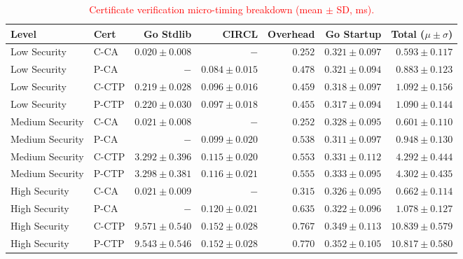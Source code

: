 \begin{table}[htbp]
  \centering
  \caption{\textcolor{red}{Certificate verification micro-timing breakdown (mean $\pm$ SD, ms).}}
  \label{tab:verify-latency}
  \begin{tabular}{llrrrrr}
    \toprule
    \textbf{Level} & \textbf{Cert} & \textbf{Go Stdlib} & \textbf{CIRCL} & \textbf{Overhead} & \textbf{Go Startup} & \textbf{Total ($\mu \pm \sigma$)} \\
    \midrule
  Low Security & C-CA & $0.020 \pm 0.008$ & $-$ & $0.252$ & $0.321 \pm 0.097$ & \textbf{$0.593 \pm 0.117$} \\
  Low Security & P-CA & $-$ & $0.084 \pm 0.015$ & $0.478$ & $0.321 \pm 0.094$ & \textbf{$0.883 \pm 0.123$} \\
  Low Security & C-CTP & $0.219 \pm 0.028$ & $0.096 \pm 0.016$ & $0.459$ & $0.318 \pm 0.097$ & \textbf{$1.092 \pm 0.156$} \\
  Low Security & P-CTP & $0.220 \pm 0.030$ & $0.097 \pm 0.018$ & $0.455$ & $0.317 \pm 0.094$ & \textbf{$1.090 \pm 0.144$} \\
  Medium Security & C-CA & $0.021 \pm 0.008$ & $-$ & $0.252$ & $0.328 \pm 0.095$ & \textbf{$0.601 \pm 0.110$} \\
  Medium Security & P-CA & $-$ & $0.099 \pm 0.020$ & $0.538$ & $0.311 \pm 0.097$ & \textbf{$0.948 \pm 0.130$} \\
  Medium Security & C-CTP & $3.292 \pm 0.396$ & $0.115 \pm 0.020$ & $0.553$ & $0.331 \pm 0.112$ & \textbf{$4.292 \pm 0.444$} \\
  Medium Security & P-CTP & $3.298 \pm 0.381$ & $0.116 \pm 0.021$ & $0.555$ & $0.333 \pm 0.095$ & \textbf{$4.302 \pm 0.435$} \\
  High Security & C-CA & $0.021 \pm 0.009$ & $-$ & $0.315$ & $0.326 \pm 0.095$ & \textbf{$0.662 \pm 0.114$} \\
  High Security & P-CA & $-$ & $0.120 \pm 0.021$ & $0.635$ & $0.322 \pm 0.096$ & \textbf{$1.078 \pm 0.127$} \\
  High Security & C-CTP & $9.571 \pm 0.540$ & $0.152 \pm 0.028$ & $0.767$ & $0.349 \pm 0.113$ & \textbf{$10.839 \pm 0.579$} \\
  High Security & P-CTP & $9.543 \pm 0.546$ & $0.152 \pm 0.028$ & $0.770$ & $0.352 \pm 0.105$ & \textbf{$10.817 \pm 0.580$} \\
    \bottomrule
  \end{tabular}
\end{table}

